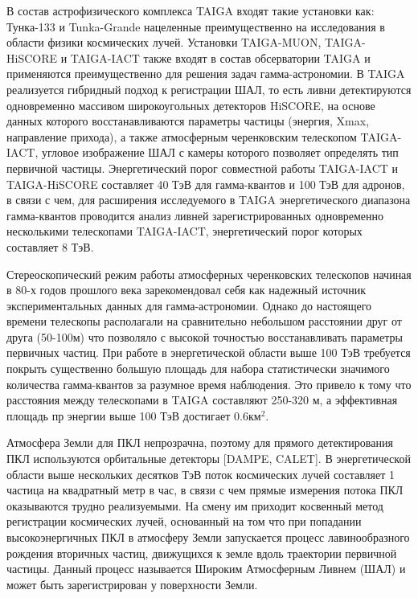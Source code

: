 В состав астрофизического комплекса TAIGA входят такие установки как: Тунка-133 и Tunka-Grande нацеленные преимущественно на исследования в области физики космических лучей. Установки TAIGA-MUON, TAIGA-HiSCORE и TAIGA-IACT также входят в состав обсерватории TAIGA и применяются преимущественно для решения задач гамма-астрономии. В TAIGA реализуется гибридный подход к регистрации ШАЛ, то есть ливни детектируются одновременно массивом широкоугольных детекторов HiSCORE, на основе данных которого восстанавливаются параметры частицы (энергия, Xmax, направление прихода), а также атмосферным черенковским телескопом TAIGA-IACT, угловое изображение ШАЛ с камеры которого позволяет определять тип первичной частицы. Энергетический порог совместной работы TAIGA-IACT и TAIGA-HiSCORE составляет 40 ТэВ для гамма-квантов и 100 ТэВ для адронов, в связи с чем, для расширения исследуемого в TAIGA энергетического диапазона гамма-квантов проводится анализ ливней зарегистрированных одновременно несколькими телескопами TAIGA-IACT, энергетический порог которых составляет 8 ТэВ.

Стереоскопический режим работы атмосферных черенковских телескопов начиная в 80-х годов прошлого века зарекомендовал себя как надежный источник экспериментальных данных для гамма-астрономии. Однако до настоящего времени телескопы располагали на сравнительно небольшом расстоянии друг от друга (50-100м) что позволяло с высокой точностью восстанавливать параметры первичных частиц. При работе в энергетической области выше 100 ТэВ требуется покрыть существенно большую площадь для набора статистически значимого количества гамма-квантов за разумное время наблюдения. Это привело к тому что расстояния между телескопами в TAIGA составляют 250-320 м, а эффективная площадь пр энергии выше 100 ТэВ достигает $0.6\text{км}^2$.


Атмосфера Земли для ПКЛ непрозрачна, поэтому для прямого детектирования ПКЛ используются орбитальные детекторы [DAMPE, CALET]. В энергетической области выше нескольких десятков ТэВ поток космических лучей составляет 1 частица на квадратный метр в час, в связи с чем прямые измерения потока ПКЛ оказываются трудно реализуемыми. На смену им приходит косвенный метод регистрации космических лучей, основанный на том что при попадании высокоэнергичных ПКЛ в атмосферу Земли запускается процесс лавинообразного рождения вторичных частиц, движущихся к земле вдоль траектории первичной частицы. Данный процесс называется Широким Атмосферным Ливнем (ШАЛ) и может быть зарегистрирован у поверхности Земли. 

